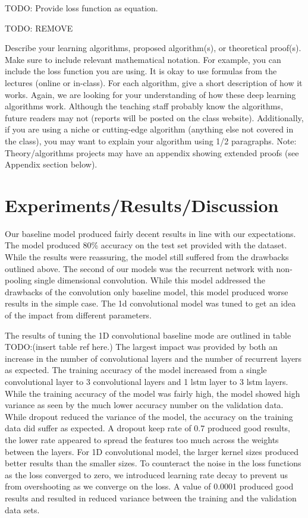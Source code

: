 \documentclass{article}
\begin{document}
TODO: Provide loss function as equation.


TODO: REMOVE

Describe your learning algorithms, proposed algorithm(s), or theoretical proof(s). Make
sure to include relevant mathematical notation. For example, you can include the loss function you are using. It is okay to use formulas from the lectures (online or in-class). For each algorithm, give a short description 
of how it works. Again, we are looking for your understanding of how these deep
learning algorithms work. Although the teaching staff probably know the algorithms, future
readers may not (reports will be posted on the class website). Additionally, if you are
using a niche or cutting-edge algorithm (anything else not covered in the class), you may want to explain your algorithm using 1/2
paragraphs. Note: Theory/algorithms projects may have an appendix showing extended
proofs (see Appendix section below).

\section{Experiments/Results/Discussion}
Our baseline model produced fairly decent results in line with our
expectations. The model produced 80\% accuracy on the test set
provided with the dataset. While the results were reassuring, the
model still suffered from the drawbacks outlined above. The second of
our models was the recurrent network with non-pooling single
dimensional convolution. While this model addressed the drawbacks of
the convolution only baseline model, this model produced worse results
in the simple case. The 1d convolutional model was tuned to get an
idea of the impact from different parameters.

The results of tuning the 1D convolutional baseline mode are outlined
in table TODO:(insert table ref here.) The largest impact was provided
by both an increase in the number of convolutional layers and the
number of recurrent layers as expected. The training accuracy of the
model increased from a single convolutional layer to 3 convolutional
layers and 1 lstm layer to 3 lstm layers. While the training accuracy
of the model was fairly high, the model showed high variance as seen
by the much lower accuracy number on the validation data. While
dropout reduced the variance of the model, the accuracy on the
training data did suffer as expected. A dropout keep rate of 0.7
produced good results, the lower rate appeared to spread the features
too much across the weights between the layers. For 1D convolutional
model, the larger kernel sizes produced better results than the
smaller sizes. To counteract the noise in the loss functions as the
loss converged to zero, we introduced learning rate decay to prevent
us from overshooting as we converge on the loss. A value of 0.0001
produced good results and resulted in reduced variance between the
training and the validation data sets.
\end{document}
